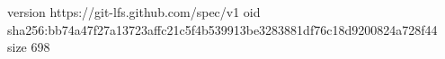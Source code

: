 version https://git-lfs.github.com/spec/v1
oid sha256:bb74a47f27a13723affc21c5f4b539913be3283881df76c18d9200824a728f44
size 698
